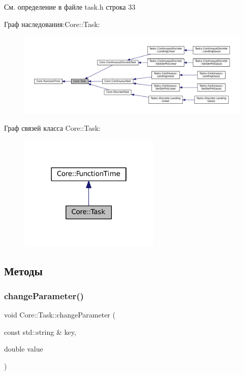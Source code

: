 См. определение в файле task.\+h строка 33



Граф наследования\+:Core\+:\+:Task\+:\nopagebreak
\begin{figure}[H]
\begin{center}
\leavevmode
\includegraphics[width=350pt]{class_core_1_1_task__inherit__graph}
\end{center}
\end{figure}


Граф связей класса Core\+:\+:Task\+:\nopagebreak
\begin{figure}[H]
\begin{center}
\leavevmode
\includegraphics[width=190pt]{class_core_1_1_task__coll__graph}
\end{center}
\end{figure}


\subsection{Методы}
\hypertarget{class_core_1_1_task_ac8b451d78816e62347954452b7ace250}{}\label{class_core_1_1_task_ac8b451d78816e62347954452b7ace250} 
\subsubsection{\texorpdfstring{change\+Parameter()}{changeParameter()}}
{\footnotesize\ttfamily void Core\+::\+Task\+::change\+Parameter (\begin{DoxyParamCaption}\item[{const std\+::string \&}]{key,  }\item[{double}]{value }\end{DoxyParamCaption})}



